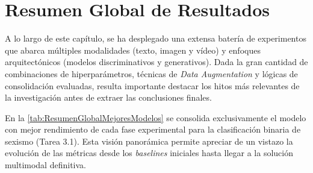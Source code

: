 \section{Resumen Global de Resultados}
\label{sec:ResumenGlobalDeResultados}

A lo largo de este capítulo, se ha desplegado una extensa batería de experimentos que abarca múltiples modalidades (texto, imagen y vídeo) y enfoques arquitectónicos (modelos discriminativos y generativos). Dada la gran cantidad de combinaciones de hiperparámetros, técnicas de \textit{Data Augmentation} y lógicas de consolidación evaluadas, resulta importante destacar los hitos más relevantes de la investigación antes de extraer las conclusiones finales.

En la \autoref{tab:ResumenGlobalMejoresModelos} se consolida exclusivamente el modelo con mejor rendimiento de cada fase experimental para la clasificación binaria de sexismo (Tarea 3.1). Esta visión panorámica permite apreciar de un vistazo la evolución de las métricas desde los \textit{baselines} iniciales hasta llegar a la solución multimodal definitiva.

